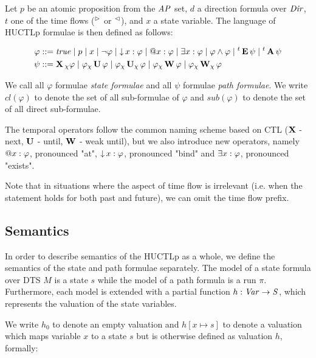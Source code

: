 \begin{definition}
	Let $p$ be an atomic proposition from the $\mathit{AP}$ set, $d$ a direction formula over $\mathit{Dir}$,  $t$ one of the time flows (${}^\vartriangleright{}$ or ${}^\vartriangleleft{}$), and $x$ a state variable. The language of \ac{HUCTLp} formulae is then defined as follows:
	
	\begin{align*}
	\varphi 	&::= 	\mathit{true} 
	\mid p 
	\mid x 
	\mid  \neg \varphi 
	\mid \operatorname{\downarrow} x : \varphi 
	\mid \operatorname{@\!} x : \varphi 
	\mid \exists x : \varphi 
	\mid \varphi \land \varphi 
	\mid {}^{t}\operatorname{\mathbf{E}} \psi 
	\mid {}^{t}\operatorname{\mathbf{A}} \psi 
	\\
	\psi 		  &::= 	  
	\operatorname{\mathbf{X}}{}_{\chi} \varphi \mid
	\varphi {}_{\chi}\operatorname{\mathbf{U}} \varphi \mid
	\varphi {}_{\chi}\operatorname{\mathbf{U}}_{\chi} \varphi \mid
	\varphi {}_{\chi}\operatorname{\mathbf{W}} \varphi \mid
	\varphi {}_{\chi}\operatorname{\mathbf{W}}_{\chi} \varphi
	\\
	\end{align*}
	
\end{definition}

We call all $\varphi$ formulae \emph{state formulae} and all $\psi$ formulae \emph{path formulae}. We write $cl(\varphi)$ to denote the set of all sub-formulae of $\varphi$ and $sub(\varphi)$ to denote the set of all direct sub-formulae.

The temporal operators follow the common naming scheme based on \ac{CTL} ($\operatorname{\mathbf{X}}$ - next, $\operatorname{\mathbf{U}}$ - until, $\operatorname{\mathbf{W}}$ - weak until), but we also introduce new operators, namely $\operatorname{@\!} x : \varphi$, pronounced "at", $\operatorname{\downarrow} x : \varphi$, pronounced "bind" and $\exists x : \varphi$, pronounced "exists".

Note that in situations where the aspect of time flow is irrelevant (i.e. when the statement holds for both past and future), we can omit the time flow prefix.

\subsection{Semantics}

In order to describe semantics of the \ac{HUCTLp} as a whole, we define the semantics of the state and path formulae separately. The model of a state formula over \ac{DTS} $M$ is a state $s$ while the model of a path formula is a run $\pi$. Furthermore, each model is extended with a partial function $h : \mathit{Var} \to \mathit{S}$, which represents the valuation of the state variables.

We write $h_0$ to denote an empty valuation and $h[x \mapsto s]$ to denote a valuation which maps variable $x$ to a state $s$ but is otherwise defined as valuation $h$, formally:

